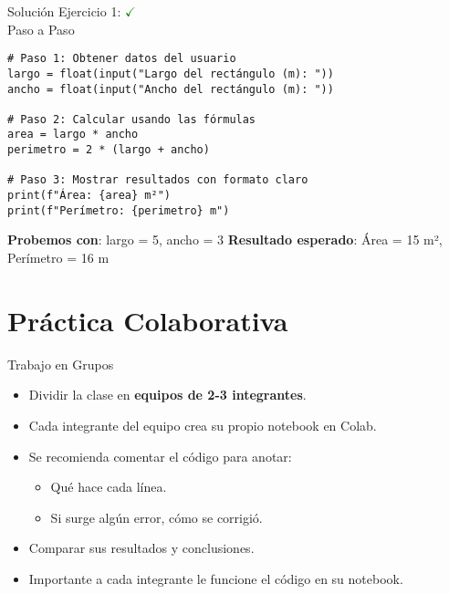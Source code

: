 \documentclass[10pt]{beamer}
\begin{document}
\begin{frame}[fragile]{Solución Ejercicio 1: \hfill \textcolor{green}{$\checkmark$} \\ Paso a Paso}
\begin{verbatim}
# Paso 1: Obtener datos del usuario
largo = float(input("Largo del rectángulo (m): "))
ancho = float(input("Ancho del rectángulo (m): "))

# Paso 2: Calcular usando las fórmulas
area = largo * ancho
perimetro = 2 * (largo + ancho)

# Paso 3: Mostrar resultados con formato claro
print(f"Área: {area} m²")
print(f"Perímetro: {perimetro} m")
\end{verbatim}

\textbf{Probemos con}: largo = 5, ancho = 3
\textbf{Resultado esperado}: Área = 15 m², Perímetro = 16 m
\end{frame}


\section{Práctica Colaborativa}

\begin{frame}{Trabajo en Grupos}
  \begin{itemize}
    \item Dividir la clase en \textbf{equipos de 2-3 integrantes}.
    \item Cada integrante del equipo crea su propio notebook en Colab.
    \item Se recomienda comentar el código para anotar:
      \begin{itemize}
        \item Qué hace cada línea.
        \item Si surge algún error, cómo se corrigió.
      \end{itemize}
    \item Comparar sus resultados y conclusiones.
    \item Importante a cada integrante le funcione el código en su notebook.
  \end{itemize}
\end{frame}
\end{document}
